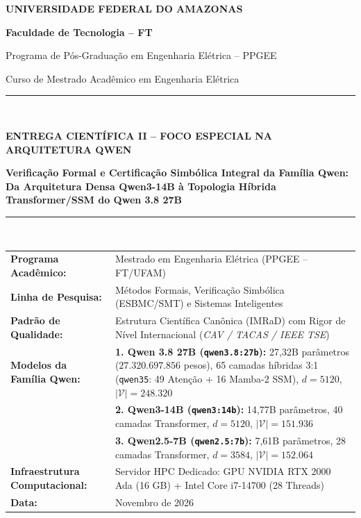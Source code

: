 \documentclass[11pt,a4paper]{article}
\theoremstyle{definition}
\begin{document}
\begin{titlepage}
    \centering
    \vspace*{0.3cm}
    {\Huge\bfseries\color{ufamblue} UNIVERSIDADE FEDERAL DO AMAZONAS \par}
    \vspace{0.25cm}
    {\Large\bfseries Faculdade de Tecnologia -- FT \par}
    {\large Programa de Pós-Graduação em Engenharia Elétrica -- PPGEE \par}
    {\normalsize Curso de Mestrado Acadêmico em Engenharia Elétrica \par}
    \vspace{0.85cm}
    
    \rule{\linewidth}{1.5pt} \\[0.35cm]
    {\large\bfseries ENTREGA CIENTÍFICA II -- FOCO ESPECIAL NA ARQUITETURA QWEN \par}
    \vspace{0.25cm}
    {\LARGE\bfseries Verificação Formal e Certificação Simbólica Integral da Família Qwen: Da Arquitetura Densa Qwen3-14B à Topologia Híbrida Transformer/SSM do Qwen 3.8 27B \par}
    \rule{\linewidth}{1.5pt} \\[0.75cm]
    
    \begin{minipage}{0.98\textwidth}
        \small
        \begin{tabularx}{\linewidth}{l X}
            \textbf{Programa Acadêmico:} & Mestrado em Engenharia Elétrica (PPGEE -- FT/UFAM) \\
            \textbf{Linha de Pesquisa:} & Métodos Formais, Verificação Simbólica (ESBMC/SMT) e Sistemas Inteligentes \\
            \textbf{Padrão de Qualidade:} & Estrutura Científica Canônica (IMRaD) com Rigor de Nível Internacional (\textit{CAV / TACAS / IEEE TSE}) \\
            \textbf{Modelos da Família Qwen:} & \textbf{1. Qwen 3.8 27B (\texttt{qwen3.8:27b}):} 27,32B parâmetros ($27.320.697.856$ pesos), 65 camadas híbridas 3:1 (\texttt{qwen35}: 49 Atenção + 16 Mamba-2 SSM), $d=5120$, $|\mathcal{V}|=248.320$ \\
            & \textbf{2. Qwen3-14B (\texttt{qwen3:14b}):} 14,77B parâmetros, 40 camadas Transformer, $d=5120$, $|\mathcal{V}|=151.936$ \\
            & \textbf{3. Qwen2.5-7B (\texttt{qwen2.5:7b}):} 7,61B parâmetros, 28 camadas Transformer, $d=3584$, $|\mathcal{V}|=152.064$ \\
            \textbf{Infraestrutura Computacional:} & Servidor HPC Dedicado: GPU NVIDIA RTX 2000 Ada (16 GB) + Intel Core i7-14700 (28 Threads) \\
            \textbf{Data:} & Novembro de 2026
        \end{tabularx}
    \end{minipage}
    

\end{titlepage}
\end{document}
